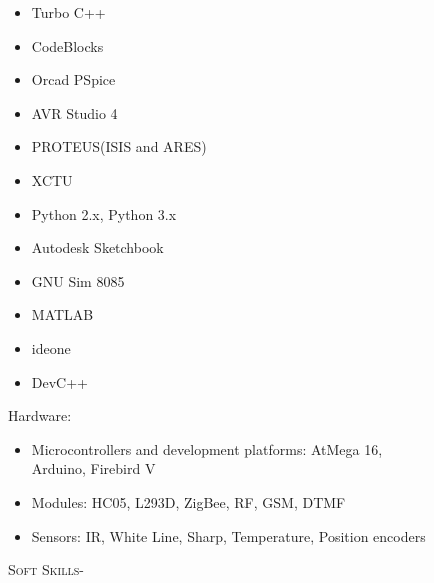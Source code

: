 \documentclass[11pt]{article}
\begin{document}
\begin{figure}[ht]
\begin{minipage}[b]{0.45\linewidth}
\begin{small}
\begin{enumerate}
\begin{itemize}
\item  Turbo C++
\item CodeBlocks
\item  Orcad PSpice
\item AVR Studio 4
\item PROTEUS(ISIS and ARES)
\item XCTU
\item Python 2.x, Python 3.x
\item Autodesk Sketchbook
\item GNU Sim 8085
\item MATLAB
\item  ideone
\item  DevC++
\end{itemize}
\noindent\colorbox{FaintOrange}
{\parbox{\dimexpr\textwidth-2\fboxsep\relax}
{
\item  Hardware:
}}
\begin{itemize}
\item Microcontrollers and development platforms: AtMega 16, Arduino, Firebird V
\item Modules: HC05, L293D, ZigBee, RF, GSM, DTMF
\item Sensors: IR, White Line, Sharp, Temperature, Position encoders

\end{itemize}

\end{enumerate}
\end{small}
\end{minipage}
\hspace{0.5cm}
\begin{minipage}[b]{0.45\linewidth}
\noindent\colorbox{WeakOrange}
{\parbox{\dimexpr\textwidth-2\fboxsep\relax}{\textsc{Soft Skills-}}}


\end{minipage}
\end{figure}
\end{document}
